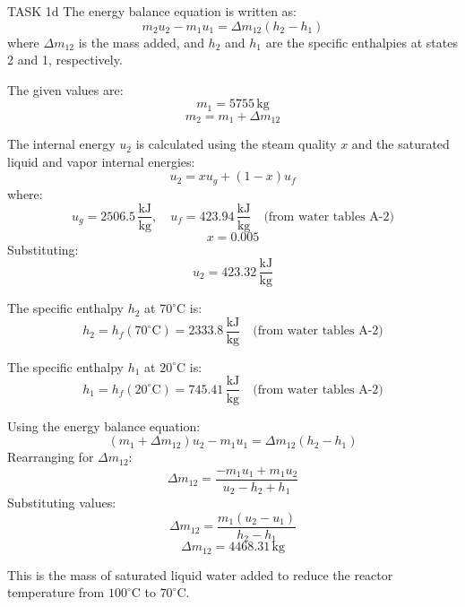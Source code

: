 TASK 1d  
The energy balance equation is written as:  
\[
m_2 u_2 - m_1 u_1 = \Delta m_{12} (h_2 - h_1)
\]  
where \( \Delta m_{12} \) is the mass added, and \( h_2 \) and \( h_1 \) are the specific enthalpies at states 2 and 1, respectively.  

The given values are:  
\[
m_1 = 5755 \, \text{kg}
\]  
\[
m_2 = m_1 + \Delta m_{12}
\]  

The internal energy \( u_2 \) is calculated using the steam quality \( x \) and the saturated liquid and vapor internal energies:  
\[
u_2 = x u_g + (1 - x) u_f
\]  
where:  
\[
u_g = 2506.5 \, \frac{\text{kJ}}{\text{kg}}, \quad u_f = 423.94 \, \frac{\text{kJ}}{\text{kg}} \quad \text{(from water tables A-2)}
\]  
\[
x = 0.005
\]  
Substituting:  
\[
u_2 = 423.32 \, \frac{\text{kJ}}{\text{kg}}
\]  

The specific enthalpy \( h_2 \) at \( 70^\circ\text{C} \) is:  
\[
h_2 = h_f(70^\circ\text{C}) = 2333.8 \, \frac{\text{kJ}}{\text{kg}} \quad \text{(from water tables A-2)}
\]  

The specific enthalpy \( h_1 \) at \( 20^\circ\text{C} \) is:  
\[
h_1 = h_f(20^\circ\text{C}) = 745.41 \, \frac{\text{kJ}}{\text{kg}} \quad \text{(from water tables A-2)}
\]  

Using the energy balance equation:  
\[
(m_1 + \Delta m_{12}) u_2 - m_1 u_1 = \Delta m_{12} (h_2 - h_1)
\]  
Rearranging for \( \Delta m_{12} \):  
\[
\Delta m_{12} = \frac{-m_1 u_1 + m_1 u_2}{u_2 - h_2 + h_1}
\]  
Substituting values:  
\[
\Delta m_{12} = \frac{m_1 (u_2 - u_1)}{h_2 - h_1}
\]  
\[
\Delta m_{12} = 4468.31 \, \text{kg}
\]  

This is the mass of saturated liquid water added to reduce the reactor temperature from \( 100^\circ\text{C} \) to \( 70^\circ\text{C} \).